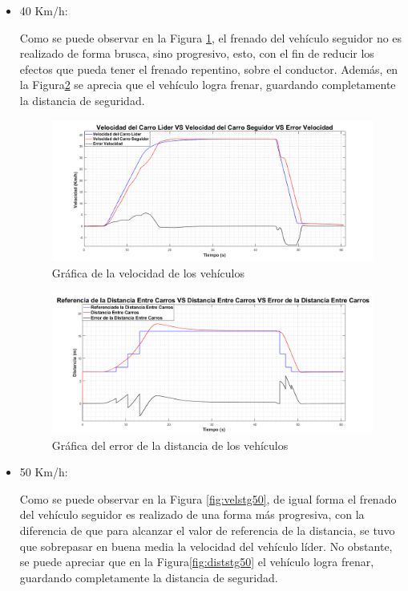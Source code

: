\begin{itemize}

\item 40 Km/h:

Como se puede observar en la Figura \ref{fig:velstg40}, el frenado del vehículo seguidor no es realizado de forma brusca, sino progresivo, esto, con el fin de reducir los efectos que pueda tener el frenado repentino, sobre el conductor. Además, en la Figura\ref{fig:diststg40} se aprecia que el vehículo logra frenar, guardando completamente la distancia de seguridad.\\
   
\begin{figure}[H]
	\centering
		\includegraphics[scale=0.35]{Imagenes/stg40}
		\caption{Gráfica de la velocidad de los vehículos}
		\label{fig:velstg40}
\end{figure}	

\begin{figure}[H]
	\centering
		\includegraphics[scale=0.35]{Imagenes/stg40dist}
		\caption{Gráfica del error de la distancia de los vehículos}
		\label{fig:diststg40}
\end{figure}	

\item50 Km/h:

Como se puede observar en la Figura \ref{fig:velstg50}, de igual forma el frenado del vehículo seguidor es realizado de una forma más progresiva, con la diferencia de que para alcanzar el valor de referencia de la distancia, se tuvo que sobrepasar en buena media la velocidad del vehículo líder. No obstante, se puede apreciar que en la Figura\ref{fig:diststg50} el vehículo logra frenar, guardando completamente la distancia de seguridad.\\


\end{itemize}
